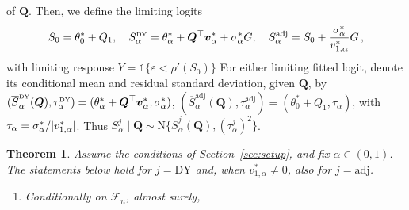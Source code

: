 \documentclass{article}
\makeatletter
\newtheorem{theorem}{Theorem}[section]
\theoremstyle{definition}
\newcommand{\abs}[1]{%
	\ensuremath{%
		\if@display
		\left| #1 \right|
		\else
		\lvert #1 \rvert
		\fi
	}%
}
\newcommand*{\bb}{\boldsymbol}
\def\bv{\bb{v}}
\makeatother
\begin{document}
\begin{bibunit}
of $\bb Q$. 
Then, we define the limiting logits 
\begin{equation}
\label{eq:prediction-limiting-logits}
\begin{aligned}
    S_0
    =
    \theta_0^*+Q_1,
    \quad
    S_\alpha^{\textrm{\tiny DY}}
    =
    \theta_\alpha^*
    +\bb Q^\top\bv_\alpha^*
    +\sigma_\alpha^*G, \quad 
    S_\alpha^{\textrm{adj}}
    =
    S_0
    +\frac{\sigma_\alpha^*}{v_{1,\alpha}^*}G\,, 
\end{aligned}
\end{equation}
with limiting response $Y=\mathds{1}\{\varepsilon<\rho'(S_0)\}$
For either limiting fitted logit, denote its conditional mean and residual
standard deviation, given $\bb Q$, by $( \overline S_\alpha^{\textrm{\tiny DY}}(\bb Q),
        \tau_\alpha^{\textrm{\tiny DY}}) = (\theta_\alpha^*+\bb Q^\top\bv_\alpha^*,
        \sigma_\alpha^*)$, $(\overline S_\alpha^{\textrm{adj}}(\bb Q),
        \tau_\alpha^{\textrm{adj}}) = (\theta_0^*+Q_1,
        \tau_\alpha)$,
with $\tau_\alpha = \sigma^*_\alpha / \abs{v_{1,\alpha}^*}$. 
Thus
$S_\alpha^j\mid\bb Q\sim
\mathrm N\{\overline S_\alpha^j(\bb Q),(\tau_\alpha^j)^2\}$. 
\begin{theorem}
\label{thm:prediction-classification}
Assume the conditions of Section~\ref{sec:setup}, and fix
$\alpha\in(0,1)$. The statements below hold for $j=\mathrm{DY}$ and, when
$v_{1,\alpha}^*\neq0$, also for $j=\mathrm{adj}$.
\begin{enumerate}[label=(\roman*)]
    \item Conditionally on $\mathcal F_n$, almost surely,
    \begin{equation}
    \label{eq:prediction-joint-limit}

\end{equation}
\end{enumerate}
\end{theorem}
\end{bibunit}
\end{document}
